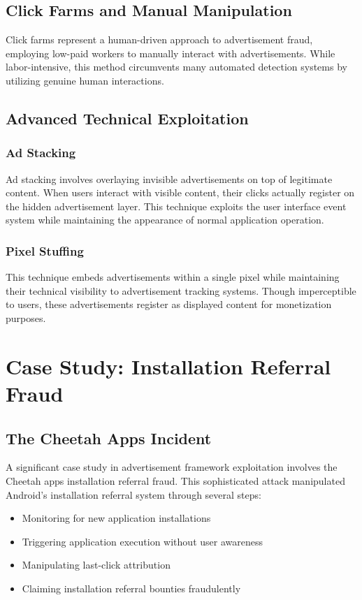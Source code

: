 \documentclass{article}
\begin{document}
\subsection{Click Farms and Manual Manipulation}
Click farms represent a human-driven approach to advertisement fraud, employing low-paid workers to manually interact with advertisements. While labor-intensive, this method circumvents many automated detection systems by utilizing genuine human interactions.

\subsection{Advanced Technical Exploitation}
\subsubsection{Ad Stacking}
Ad stacking involves overlaying invisible advertisements on top of legitimate content. When users interact with visible content, their clicks actually register on the hidden advertisement layer. This technique exploits the user interface event system while maintaining the appearance of normal application operation.

\subsubsection{Pixel Stuffing}
This technique embeds advertisements within a single pixel while maintaining their technical visibility to advertisement tracking systems. Though imperceptible to users, these advertisements register as displayed content for monetization purposes.

\section{Case Study: Installation Referral Fraud}
\subsection{The Cheetah Apps Incident}
A significant case study in advertisement framework exploitation involves the Cheetah apps installation referral fraud. This sophisticated attack manipulated Android's installation referral system through several steps:

\begin{itemize}
    \item Monitoring for new application installations
    \item Triggering application execution without user awareness
    \item Manipulating last-click attribution
    \item Claiming installation referral bounties fraudulently
\end{itemize}
\end{document}
